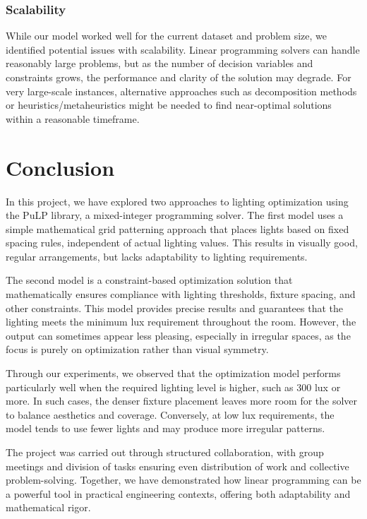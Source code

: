 \documentclass{article}
\begin{document}
\subsubsection{Scalability}
While our model worked well for the current dataset and problem size, we identified potential issues with scalability. 
Linear programming solvers can handle reasonably large problems, but as the number of decision variables and constraints 
grows, the performance and clarity of the solution may degrade. For very large-scale instances, alternative approaches 
such as decomposition methods or heuristics/metaheuristics might be needed to find near-optimal solutions within a 
reasonable timeframe.

\newpage

\section{Conclusion}

In this project, we have explored two approaches to lighting optimization using the PuLP library, a mixed-integer programming solver.
The first model uses a simple mathematical grid patterning approach that places lights based on fixed spacing rules, independent of actual lighting values.
This results in visually good, regular arrangements, but lacks adaptability to lighting requirements.

The second model is a constraint-based optimization solution that mathematically ensures compliance with lighting thresholds,
fixture spacing, and other constraints. This model provides precise results and guarantees that the lighting meets the minimum lux requirement
throughout the room. However, the output can sometimes appear less pleasing, especially in irregular spaces, as the focus is purely on optimization rather than visual symmetry.

Through our experiments, we observed that the optimization model performs particularly well when the required lighting level is higher,
such as 300 lux or more. In such cases, the denser fixture placement leaves more room for the solver to balance aesthetics and coverage.
Conversely, at low lux requirements, the model tends to use fewer lights and may produce more irregular patterns.

The project was carried out through structured collaboration, with group meetings and division of tasks ensuring even distribution of work 
and collective problem-solving. Together, we have demonstrated how linear programming can be a powerful tool
in practical engineering contexts, offering both adaptability and mathematical rigor.
\end{document}
